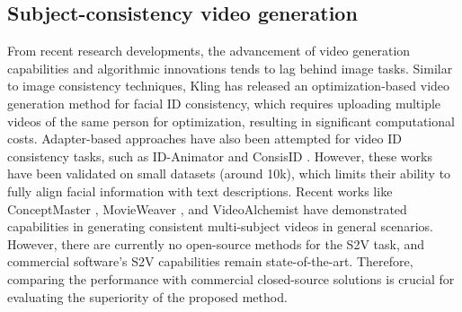 \subsection{Subject-consistency video generation}
\label{sec:related_work:video}

From recent research developments, the advancement of video generation capabilities and algorithmic innovations tends to lag behind image tasks. Similar to image consistency techniques, Kling \cite{Keling} has released an optimization-based video generation method for facial ID consistency, which requires uploading multiple videos of the same person for optimization, resulting in significant computational costs. Adapter-based approaches have also been attempted for video ID consistency tasks, such as ID-Animator \cite{he2024id} and ConsisID \cite{yuan2024identity}. However, these works have been validated on small datasets (around 10k), which limits their ability to fully align facial information with text descriptions. Recent works like ConceptMaster \cite{huang2025conceptmaster}, MovieWeaver \cite{liang2025movie}, and VideoAlchemist \cite{chen2025multi} have demonstrated capabilities in generating consistent multi-subject videos in general scenarios. However, there are currently no open-source methods for the S2V task, and commercial software's S2V capabilities \cite{Vidu, Pika, Keling, Hailuo, polyak2024movie} remain state-of-the-art. Therefore, comparing the performance with commercial closed-source solutions is crucial for evaluating the superiority of the proposed method.
